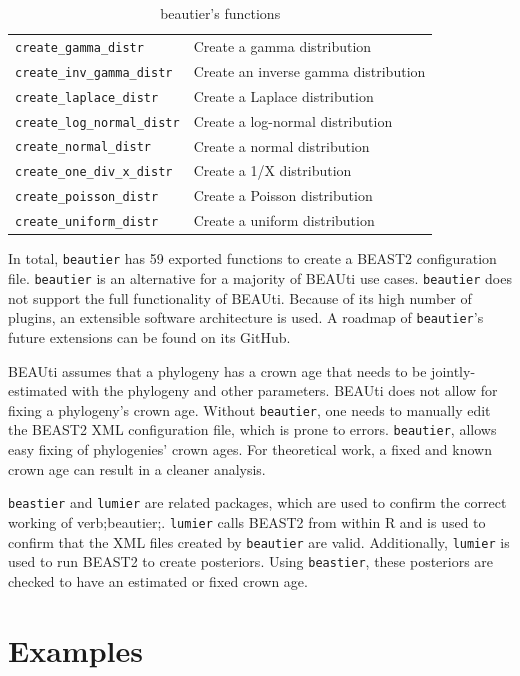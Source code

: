 \documentclass{article}
\begin{document}
\begin{table}[]
\begin{tabular}{ | l | l | }
\verb;create_gamma_distr; & Create a gamma distribution \\
\verb;create_inv_gamma_distr; & Create an inverse gamma distribution \\
\verb;create_laplace_distr; & Create a Laplace distribution \\
\verb;create_log_normal_distr; & Create a log-normal distribution \\
\verb;create_normal_distr; & Create a normal distribution \\
\verb;create_one_div_x_distr; & Create a 1/X distribution \\
\verb;create_poisson_distr; & Create a Poisson distribution \\
\verb;create_uniform_distr; & Create a uniform distribution \\
\hline
\end{tabular}
\caption{beautier's functions}
\label{tab:functions}
\end{table}

In total, \verb;beautier; has 59 exported functions to create
a BEAST2 configuration file. \verb;beautier; is an alternative for a majority of BEAUti use cases.
\verb;beautier; does not support the full functionality of BEAUti. 
Because of its high number of plugins, an extensible software architecture is used.
A roadmap of \verb;beautier;'s future extensions can be found on its GitHub.

BEAUti assumes that a phylogeny has a crown age that needs to be jointly-estimated
with the phylogeny and other parameters. BEAUti does not allow for fixing
a phylogeny's crown age. Without \verb;beautier;, one needs to manually edit the BEAST2 
XML configuration file, which is prone to errors. \verb;beautier;, allows easy
fixing of phylogenies' crown ages. For theoretical work, a fixed and known crown age can result
in a cleaner analysis. 

\verb;beastier; and \verb;lumier; are related packages, which are used to confirm the correct
working of verb;beautier;. \verb;lumier; calls BEAST2 from within R and is used to confirm that the XML files 
created by \verb;beautier; are valid. Additionally, \verb;lumier; is used to run BEAST2
to create posteriors. Using \verb;beastier;, these posteriors are checked to have an
estimated or fixed crown age.

\section{Examples}
\end{document}
